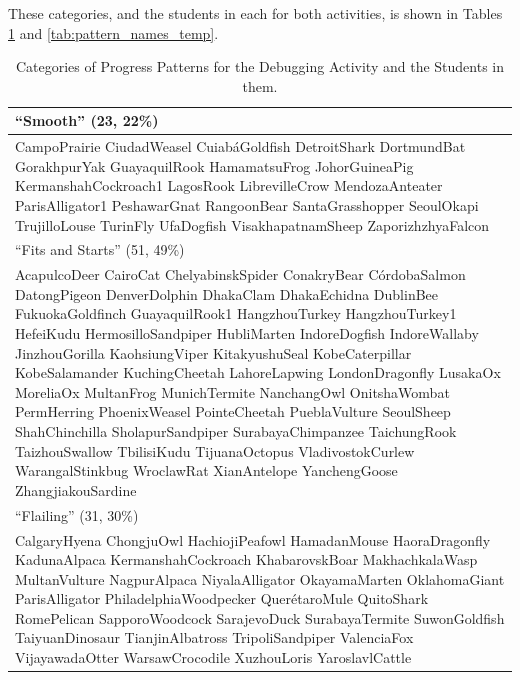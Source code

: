 These categories, and the students in each for both activities, is shown in Tables \ref{tab:pattern_names_debug} and \ref{tab:pattern_names_temp}.

\begin{table}
\begin{centering}
	\begin{tabular}{p{\textwidth}}
	\hline \hline
	``Smooth'' (23, 22\%)\\ \hline
		CampoPrairie		
		CiudadWeasel		
		CuiabáGoldfish		
		DetroitShark		
		DortmundBat			
		GorakhpurYak		
		GuayaquilRook		
		HamamatsuFrog		
		JohorGuineaPig		
		KermanshahCockroach1
		LagosRook			
		LibrevilleCrow		
		MendozaAnteater		
		ParisAlligator1		
		PeshawarGnat		
		RangoonBear			
		SantaGrasshopper	
		SeoulOkapi			
		TrujilloLouse		
		TurinFly			
		UfaDogfish			
		VisakhapatnamSheep	
		ZaporizhzhyaFalcon	\\ \hline \hline

	``Fits and Starts'' (51, 49\%)\\ \hline
		AcapulcoDeer		
		CairoCat			
		ChelyabinskSpider	
		ConakryBear		
		CórdobaSalmon	
		DatongPigeon		
		DenverDolphin		
		DhakaClam			
		DhakaEchidna		
		DublinBee			
		FukuokaGoldfinch	
		GuayaquilRook1	
		HangzhouTurkey	
		HangzhouTurkey1	
		HefeiKudu			
		HermosilloSandpiper
		HubliMarten		
		IndoreDogfish		
		IndoreWallaby		
		JinzhouGorilla	
		KaohsiungViper	
		KitakyushuSeal	
		KobeCaterpillar	
		KobeSalamander		
		KuchingCheetah		
		LahoreLapwing		
		LondonDragonfly		
		LusakaOx			
		MoreliaOx			
		MultanFrog			
		MunichTermite		
		NanchangOwl			
		OnitshaWombat
		PermHerring
		PhoenixWeasel
		PointeCheetah
		PueblaVulture
		SeoulSheep
		ShahChinchilla
		SholapurSandpiper
		SurabayaChimpanzee
		TaichungRook
		TaizhouSwallow
		TbilisiKudu
		TijuanaOctopus
		VladivostokCurlew
		WarangalStinkbug
		WroclawRat
		XianAntelope
		YanchengGoose
		ZhangjiakouSardine		\\ \hline \hline
	``Flailing'' (31, 30\%)\\ \hline
		CalgaryHyena
		ChongjuOwl
		HachiojiPeafowl
		HamadanMouse
		HaoraDragonfly
		KadunaAlpaca
		KermanshahCockroach
		KhabarovskBoar
		MakhachkalaWasp
		MultanVulture
		NagpurAlpaca
		NiyalaAlligator
		OkayamaMarten
		OklahomaGiant
		ParisAlligator
		PhiladelphiaWoodpecker
		QuerétaroMule
		QuitoShark
		RomePelican
		SapporoWoodcock
		SarajevoDuck
		SurabayaTermite
		SuwonGoldfish
		TaiyuanDinosaur
		TianjinAlbatross
		TripoliSandpiper
		ValenciaFox
		VijayawadaOtter
		WarsawCrocodile
		XuzhouLoris
		YaroslavlCattle	\\ \hline

	\end{tabular}
	\caption[Categories of Progress Patterns for the Debugging Activity]{Categories of Progress Patterns for the Debugging Activity and the Students in them.}
	\label{tab:pattern_names_debug}
\end{centering}
\end{table}

